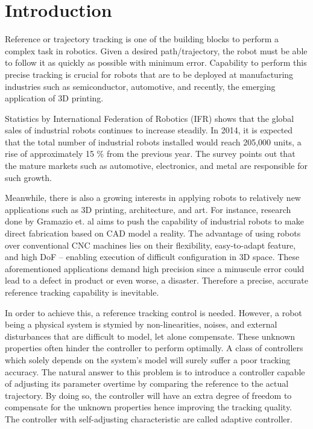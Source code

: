 %
\chapter{Introduction} \label{chap::intro}
Reference or trajectory tracking is one of the building blocks to perform a complex task in robotics. Given a desired path/trajectory, the robot must be able to follow it as quickly as possible with minimum error. Capability to perform this precise tracking is crucial for robots that are to be deployed at manufacturing industries such as semiconductor, automotive, and recently, the emerging application of 3D printing. 

Statistics by International Federation of Robotics (IFR) \cite{IFR2014} shows that the global sales of industrial robots continues to increase steadily. In 2014, it is expected that the total number of industrial robots installed would reach 205,000 units, a rise of approximately 15 \% from the previous year. The survey points out that the mature markets such as automotive, electronics, and metal are responsible for such growth. 

Meanwhile, there is also a growing interests in applying robots to relatively new applications such as 3D printing, architecture, and art. For instance, research done by Gramazio et. al \cite{Helm2014} \cite{Lloret2014} aims to push the capability of industrial robots to make direct fabrication based on CAD model a reality. The advantage of using robots over conventional CNC machines lies on their flexibility, easy-to-adapt feature, and high \ac{DoF} -- enabling execution of difficult configuration in \ac{3D} space. These aforementioned applications demand high precision since a minuscule error could lead to a defect in product or even worse, a disaster. Therefore a precise, accurate reference tracking capability is inevitable.

In order to achieve this, a reference tracking control is needed. However, a robot being a physical system is stymied by non-linearities, noises, and external disturbances that are difficult to model, let alone compensate. These unknown properties often hinder the controller to perform optimally. A class of controllers which solely depends on the system's model will surely suffer a poor tracking accuracy. The natural answer to this problem is to introduce a controller capable of adjusting its parameter overtime by comparing the reference to the actual trajectory. By doing so, the controller will have an extra degree of freedom to compensate for the unknown properties hence improving the tracking quality. The controller with self-adjusting characteristic are called adaptive controller.

